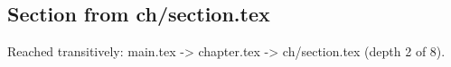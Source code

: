 \subsection{Section from ch/section.tex}
Reached transitively: main.tex -> chapter.tex -> ch/section.tex (depth 2 of 8).
